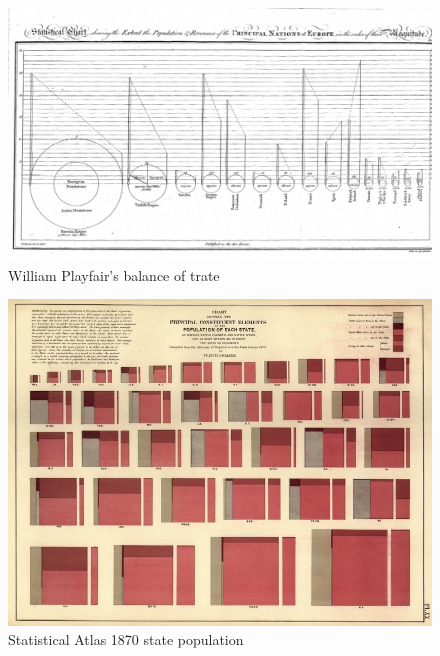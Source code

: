 \documentclass[print]{nuthesis}
\begin{document}
\begin{figure}[tbp]

{\centering \includegraphics[width=0.75\linewidth,]{images/william-playfair-balance-trade} 

}

\caption{William Playfair's balance of trate}\label{fig:william-playfair-trade}
\end{figure}

\begin{figure}[tbp]

{\centering \includegraphics[width=0.75\linewidth,]{images/statistical-atlas-state-population} 

}

\caption{Statistical Atlas 1870 state population}\label{fig:statistical-atlas-state-population}
\end{figure}
\end{document}
